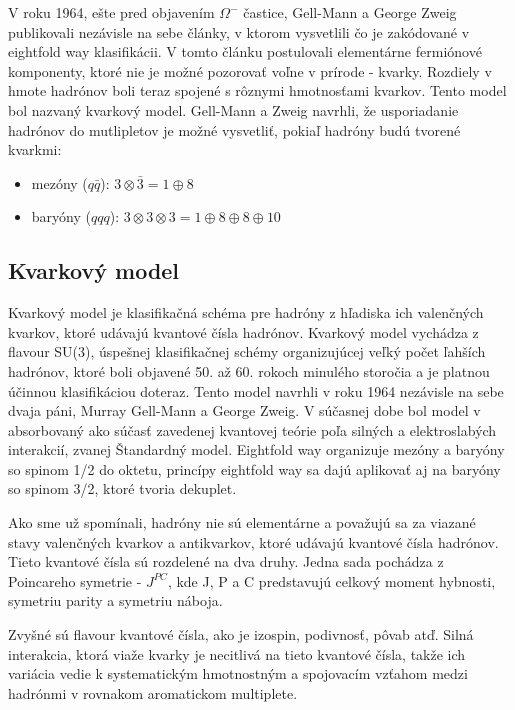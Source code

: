 \documentclass[../../main.tex]{subfiles}
\begin{document}
V roku 1964, ešte pred objavením $\Omega^{-}$ častice, Gell-Mann a George Zweig publikovali nezávisle na sebe články, v ktorom vysvetlili čo je zakódované v eightfold way klasifikácii. V tomto článku postulovali elementárne fermiónové komponenty, ktoré nie je možné pozorovať voľne v prírode - kvarky. Rozdiely v hmote hadrónov boli teraz spojené s rôznymi hmotnosťami kvarkov. Tento model bol nazvaný kvarkový model. Gell-Mann a Zweig navrhli, že usporiadanie hadrónov do mutlipletov je možné vysvetliť, pokiaľ hadróny budú tvorené kvarkmi:
\begin{itemize}
\item mezóny ($q\bar{q}$): $3\otimes \bar{3}=1\oplus 8$
\item baryóny ($qqq$): $3 \otimes 3 \otimes 3 = 1 \oplus 8 \oplus 8 \oplus 10$  
\end{itemize}

\subsection{Kvarkový model}
Kvarkový model je klasifikačná schéma pre hadróny z hľadiska ich valenčných kvarkov, ktoré udávajú kvantové čísla hadrónov. Kvarkový model vychádza z flavour SU(3), úspešnej klasifikačnej schémy organizujúcej veľký počet ľahších hadrónov, ktoré boli objavené 50. až 60. rokoch minulého storočia a je platnou účinnou klasifikáciou doteraz. Tento model navrhli v roku 1964 nezávisle na sebe dvaja páni, Murray Gell-Mann a George Zweig. V súčasnej dobe bol model v absorbovaný ako súčasť zavedenej kvantovej teórie poľa silných a elektroslabých interakcií, zvanej Štandardný model. Eightfold way organizuje mezóny a baryóny so spinom 1/2 do oktetu, princípy eightfold way sa dajú aplikovať aj na baryóny so spinom 3/2, ktoré tvoria dekuplet.

Ako sme už spomínali, hadróny nie sú elementárne a považujú sa za viazané stavy valenčných kvarkov a antikvarkov, ktoré udávajú kvantové čísla hadrónov. Tieto kvantové čísla sú rozdelené na dva druhy. Jedna sada pochádza z Poincareho symetrie - $J^{PC}$, kde J, P a C predstavujú celkový moment hybnosti, symetriu parity a symetriu náboja. 

Zvyšné sú flavour kvantové čísla, ako je izospin, podivnosť, pôvab atď. Silná interakcia, ktorá viaže kvarky je necitlivá na tieto kvantové čísla, takže ich variácia vedie k systematickým hmotnostným a spojovacím vzťahom medzi hadrónmi v rovnakom aromatickom multiplete.
\end{document}

